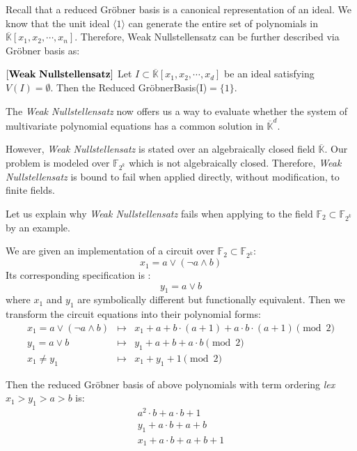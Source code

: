 Recall that a reduced Gr\"obner basis is a canonical representation of
an ideal.  We know that the unit ideal $\langle 1 \rangle$ can 
generate the entire set of polynomials in $\overline{\mathbb{K}}[x_1,
x_2, \cdots, x_n]$.  Therefore, Weak Nullstellensatz can be further
described via Gr\"obner basis as:

\begin{Corollary}\label{cor:wnf2}
$\left[\bf{Weak\  Nullstellensatz}\right]$ Let $I \subset \overline
{\mathbb{K}}[x_1, x_2, \cdots, x_d]$ be an ideal satisfying
$V(I)=\emptyset$.  Then the Reduced Gr\"obnerBasis(I)$=\{1\}$.
\end{Corollary}

The {\it Weak Nullstellensatz} now offers us a way to evaluate whether
the system of multivariate polynomial equations has a common solution
in ${\overline {\mathbb{K}}}^d$. 

However, {\it Weak Nullstellensatz} is stated over an algebraically
closed field $\overline{\mathbb{K}}$.
Our problem is modeled over $\mathbb{F}_{2^{k}}$ which is not 
algebraically closed. Therefore, {\it Weak Nullstellensatz} is bound
to fail when applied directly, without modification, to finite fields. 

Let us explain why {\it Weak Nullstellensatz} fails when applying to
the field $\mathbb{F}_{2}\subset \mathbb{F}_{2^{k}}$ by an example. 
\begin{Example} \label{exp:wnfail}
We are given an implementation of a circuit over $\mathbb{F}_2 \subset \mathbb{F}_{2^{k}}$: 
\begin{equation}
x_1=a \vee (\neg a \wedge b)
\end{equation}
Its corresponding specification is :
\begin{equation}
y_1=a \vee b
\end{equation}
where $x_1$ and $y_1$ are symbolically different but functionally equivalent.  
Then we transform the circuit equations into their polynomial forms:
\begin{eqnarray}
x_1=a \vee (\neg a \wedge b) &\mapsto& x_1 + a + b\cdot (a+1) + a\cdot b \cdot (a+1) \pmod 2 \nonumber \\
y_1=a \vee b  &\mapsto& y_{1}+a+b+a\cdot b \pmod 2 \nonumber \\
x_1 \neq y_{1}  &\mapsto& x_1+y_1+1 \pmod 2 \nonumber
\end{eqnarray}
\end{Example}
Then the reduced Gr\"obner basis of above polynomials with term
ordering {\it lex} $x_{1}>y_{1}>a>b$ is:  
\begin{eqnarray}
a^{2}\cdot b+a \cdot b+1 \nonumber \\
y_{1}+a \cdot b+a+b \nonumber \\
x_{1}+a \cdot b+a+b+1 \nonumber 
\end{eqnarray}

